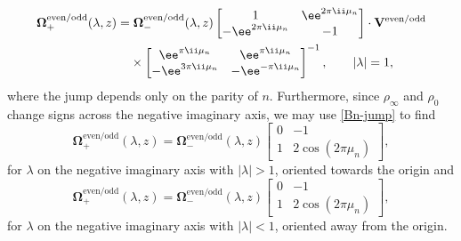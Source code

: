 \begin{align}
 &\mathbf{\Omega}^\mathrm{even/odd}_+(\lambda, z) = \mathbf{\Omega}_-^\mathrm{even/odd}(\lambda, z) \begin{bmatrix} 1 & \ee^{2\pi \ii \mu_n} \\ -\ee^{2\pi \ii \mu_n} & -1 \end{bmatrix} \cdot \mathbf{V}^\mathrm{even/odd} \nonumber\\
 &\hphantom{\mathbf{\Omega}^\mathrm{even/odd}_+(\lambda, z) =}{}
 \times\begin{bmatrix} \ee^{\pi \ii \mu_n}& \ee^{\pi \ii \mu_n}\\ - \ee^{3\pi \ii \mu_n} & - \ee^{-\pi \ii \mu_n} \end{bmatrix}^{-1}, \qquad |\lambda| = 1,
 \label{eq:Omega-jump-circle}
\end{align}
where the jump depends only on the parity of $n$. Furthermore, since $\rho_\infty$ and $\rho_0$ change signs across the negative imaginary axis, we may use \eqref{Bn-jump} to find
\begin{equation}
 \mathbf{\Omega}_+^\mathrm{even/odd} (\lambda, z) = \mathbf{\Omega}_-^\mathrm{even/odd} (\lambda, z) \begin{bmatrix}
0 & -1 \\ 1 & 2\cos(2\pi \mu_n)
\end{bmatrix},
\end{equation}
for $\lambda$ on the negative imaginary axis with $|\lambda| > 1$, oriented towards the origin and
\begin{equation}
 \mathbf{\Omega}_+^\mathrm{even/odd} (\lambda, z) = \mathbf{\Omega}_-^\mathrm{even/odd} (\lambda, z) \begin{bmatrix}
0 & -1 \\ 1 & 2\cos(2\pi \mu_n)
\end{bmatrix},
\label{eq:Omega-jump-outside-circle}
\end{equation}
for $\lambda$ on the negative imaginary axis with $|\lambda| <1$, oriented away from the origin.

